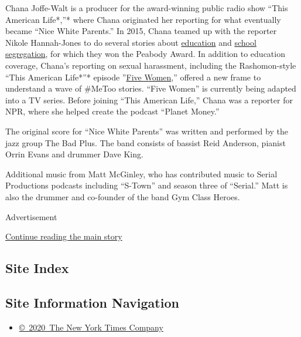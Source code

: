 Chana Joffe-Walt is a producer for the award-winning public radio show
``This American Life*,''* where Chana originated her reporting for what
eventually became ``Nice White Parents.'' In 2015, Chana teamed up with
the reporter Nikole Hannah-Jones to do several stories about
\href{https://www.thisamericanlife.org/550/three-miles}{education} and
\href{https://www.thisamericanlife.org/562/the-problem-we-all-live-with-part-one}{school
segregation}, for which they won the Peabody Award. In addition to
education coverage, Chana's reporting on sexual harassment, including
the Rashomon-style ``This American Life*''* episode
''\href{https://www.thisamericanlife.org/640/five-women}{Five Women},''
offered a new frame to understand a wave of \#MeToo stories. ``Five
Women'' is currently being adapted into a TV series. Before joining
``This American Life,'' Chana was a reporter for NPR, where she helped
create the podcast ``Planet Money.''

The original score for ``Nice White Parents'' was written and performed
by the jazz group The Bad Plus. The band consists of bassist Reid
Anderson, pianist Orrin Evans and drummer Dave King.

Additional music from Matt McGinley, who has contributed music to Serial
Productions podcasts including ``S-Town'' and season three of
``Serial.'' Matt is also the drummer and co-founder of the band Gym
Class Heroes.

Advertisement

\protect\hyperlink{after-bottom}{Continue reading the main story}

\hypertarget{site-index}{%
\subsection{Site Index}\label{site-index}}

\hypertarget{site-information-navigation}{%
\subsection{Site Information
Navigation}\label{site-information-navigation}}

\begin{itemize}
\tightlist
\item
  \href{https://help.nytimes3xbfgragh.onion/hc/en-us/articles/115014792127-Copyright-notice}{©~2020~The
  New York Times Company}
\end{itemize}

